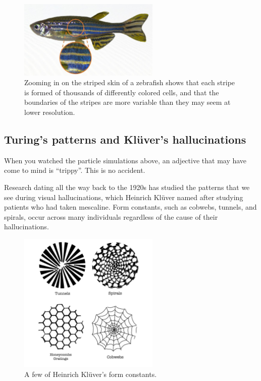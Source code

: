 {\begin{figure}[h]
\centering
\mySfFamily
\includegraphics[width = 0.6\textwidth]{../images/zebrafish_zoom.jpg}
\caption{Zooming in on the striped skin of a zebrafish shows that each stripe is formed of thousands of differently colored cells, and that the boundaries of the stripes are more variable than they may seem at lower resolution.}
\label{fig:zebrafish_zoom}
\end{figure}

\FloatBarrier
{}
\subsection{Turing's patterns and Klüver's hallucinations}

When you watched the particle simulations above, an adjective that may have come to mind is ``trippy''. This is no accident.

Research dating all the way back to the 1920s has studied the patterns that we see during visual hallucinations, which Heinrich Klüver named  after studying patients who had taken mescaline. Form constants, such as cobwebs, tunnels, and spirals, occur across many individuals regardless of the cause of their hallucinations.

\begin{figure}[h]
\centering
\mySfFamily
\includegraphics[width = 0.6\textwidth]{../images/form_constants.png}
\caption{A few of Heinrich Klüver's form constants.}
\label{fig:form_constants}
\end{figure}

}

